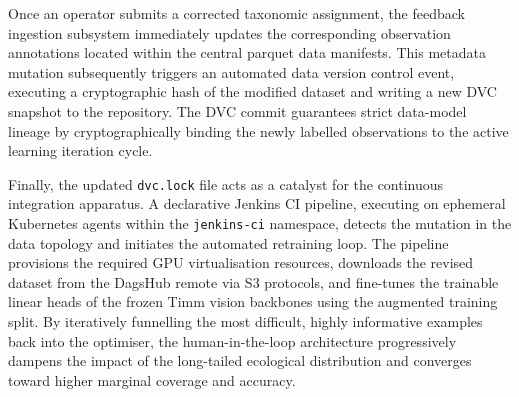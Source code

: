 Once an operator submits a corrected taxonomic assignment, the feedback ingestion subsystem immediately updates the corresponding observation annotations located within the central parquet data manifests. This metadata mutation subsequently triggers an automated data version control event, executing a cryptographic hash of the modified dataset and writing a new DVC snapshot to the repository. The DVC commit guarantees strict data-model lineage by cryptographically binding the newly labelled observations to the active learning iteration cycle.

Finally, the updated \texttt{dvc.lock} file acts as a catalyst for the continuous integration apparatus. A declarative Jenkins CI pipeline, executing on ephemeral Kubernetes agents within the \texttt{jenkins-ci} namespace, detects the mutation in the data topology and initiates the automated retraining loop. The pipeline provisions the required GPU virtualisation resources, downloads the revised dataset from the DagsHub remote via S3 protocols, and fine-tunes the trainable linear heads of the frozen Timm vision backbones using the augmented training split. By iteratively funnelling the most difficult, highly informative examples back into the optimiser, the human-in-the-loop architecture progressively dampens the impact of the long-tailed ecological distribution and converges toward higher marginal coverage and accuracy.
